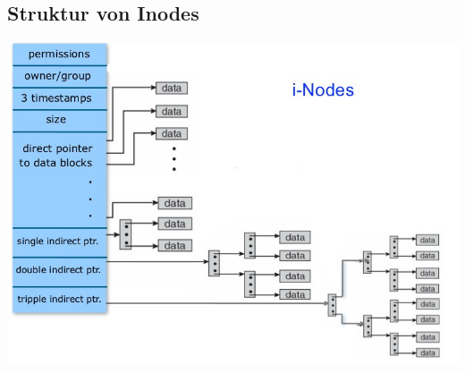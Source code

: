 \documentclass[a4paper, 10pt]{article}
\begin{document}
\subsection{Struktur von Inodes}
\includegraphics[scale=0.6]{inodes.jpg}
\end{document}
